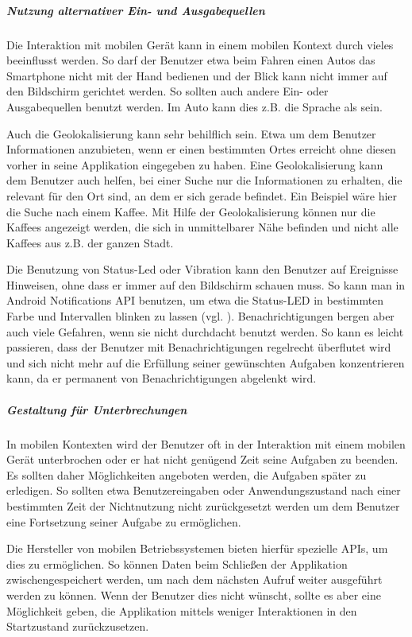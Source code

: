 \subparagraph{Nutzung alternativer Ein- und Ausgabequellen}
\label{subp:nutze_alternative_eingabenger_ten}

Die Interaktion mit mobilen Gerät kann in einem mobilen Kontext durch vieles beeinflusst werden. So darf der Benutzer etwa beim Fahren einen Autos das Smartphone nicht mit der Hand bedienen und der Blick kann nicht immer auf den Bildschirm gerichtet werden. So sollten auch andere Ein- oder Ausgabequellen benutzt werden. Im Auto kann dies z.B. die Sprache als sein.

Auch die Geolokalisierung kann sehr behilflich sein. Etwa um dem Benutzer Informationen anzubieten, wenn er einen bestimmten Ortes erreicht ohne diesen vorher in seine Applikation eingegeben zu haben. Eine Geolokalisierung kann dem Benutzer auch helfen, bei einer Suche nur die Informationen zu erhalten, die relevant für den Ort sind, an dem er sich gerade befindet. Ein Beispiel wäre hier die Suche nach einem Kaffee. Mit Hilfe der Geolokalisierung können nur die Kaffees angezeigt werden, die sich in unmittelbarer Nähe befinden und nicht alle Kaffees aus z.B. der ganzen Stadt. 

Die Benutzung von Status-Led oder Vibration kann den Benutzer auf Ereignisse Hinweisen, ohne dass er immer auf den Bildschirm schauen muss. So kann man in Android Notifications API benutzen, um etwa die Status-LED in bestimmten Farbe und Intervallen blinken zu lassen (vgl. \cite{androidNotApi}). Benachrichtigungen bergen aber auch viele Gefahren, wenn sie nicht durchdacht benutzt werden. So kann es leicht passieren, dass der Benutzer mit Benachrichtigungen regelrecht überflutet wird und sich nicht mehr auf die Erfüllung seiner gewünschten Aufgaben konzentrieren kann, da er permanent von Benachrichtigungen abgelenkt wird.

\subparagraph{Gestaltung für Unterbrechungen }
\label{subp:erm_gliche_eine_fortsetzung}

In mobilen Kontexten wird der Benutzer oft in der Interaktion mit einem mobilen Gerät unterbrochen oder er hat nicht genügend Zeit seine Aufgaben zu beenden. Es sollten daher Möglichkeiten angeboten werden, die Aufgaben später zu erledigen. So sollten etwa Benutzereingaben oder Anwendungszustand nach einer bestimmten Zeit der Nichtnutzung nicht zurückgesetzt werden um dem Benutzer eine Fortsetzung seiner Aufgabe zu ermöglichen.

Die Hersteller von mobilen Betriebssystemen bieten hierfür spezielle APIs, um dies zu ermöglichen. So können Daten beim Schließen der Applikation zwischengespeichert werden, um nach dem nächsten Aufruf  weiter ausgeführt werden zu können. Wenn der Benutzer dies nicht wünscht, sollte es aber eine Möglichkeit geben, die Applikation mittels weniger Interaktionen in den Startzustand zurückzusetzen.

